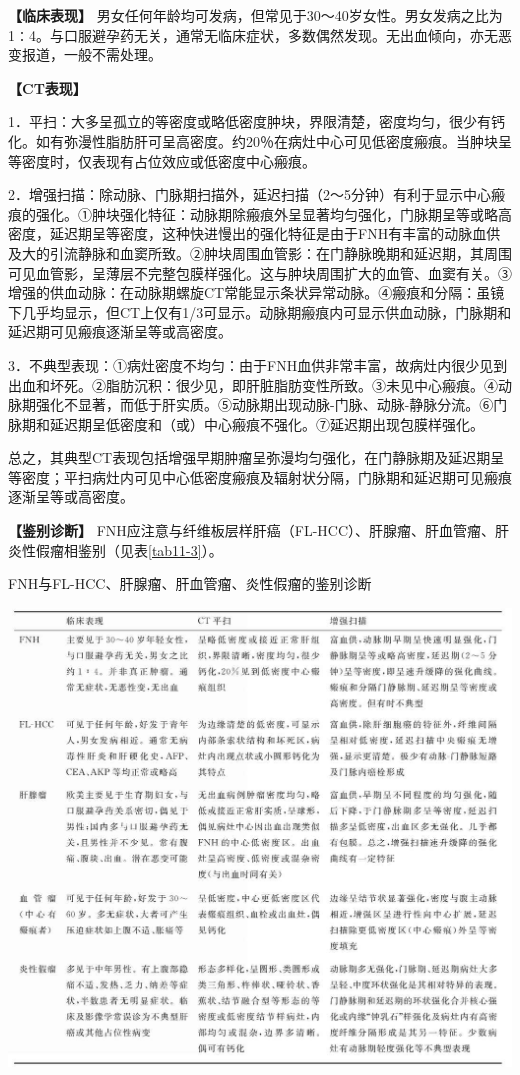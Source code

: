 \textbf{【临床表现】}
男女任何年龄均可发病，但常见于30～40岁女性。男女发病之比为1∶4。与口服避孕药无关，通常无临床症状，多数偶然发现。无出血倾向，亦无恶变报道，一般不需处理。

\textbf{【CT表现】}

1．平扫：大多呈孤立的等密度或略低密度肿块，界限清楚，密度均匀，很少有钙化。如有弥漫性脂肪肝可呈高密度。约20％在病灶中心可见低密度瘢痕。当肿块呈等密度时，仅表现有占位效应或低密度中心瘢痕。

2．增强扫描：除动脉、门脉期扫描外，延迟扫描（2～5分钟）有利于显示中心瘢痕的强化。①肿块强化特征：动脉期除瘢痕外呈显著均匀强化，门脉期呈等或略高密度，延迟期呈等密度，这种快进慢出的强化特征是由于FNH有丰富的动脉血供及大的引流静脉和血窦所致。②肿块周围血管影：在门静脉晚期和延迟期，其周围可见血管影，呈薄层不完整包膜样强化。这与肿块周围扩大的血管、血窦有关。③增强的供血动脉：在动脉期螺旋CT常能显示条状异常动脉。④瘢痕和分隔：虽镜下几乎均显示，但CT上仅有1/3可显示。动脉期瘢痕内可显示供血动脉，门脉期和延迟期可见瘢痕逐渐呈等或高密度。

3．不典型表现：①病灶密度不均匀：由于FNH血供非常丰富，故病灶内很少见到出血和坏死。②脂肪沉积：很少见，即肝脏脂肪变性所致。③未见中心瘢痕。④动脉期强化不显著，而低于肝实质。⑤动脉期出现动脉-门脉、动脉-静脉分流。⑥门脉期和延迟期呈低密度和（或）中心瘢痕不强化。⑦延迟期出现包膜样强化。

总之，其典型CT表现包括增强早期肿瘤呈弥漫均匀强化，在门静脉期及延迟期呈等密度；平扫病灶内可见中心低密度瘢痕及辐射状分隔，门脉期和延迟期可见瘢痕逐渐呈等或高密度。

\textbf{【鉴别诊断】}
FNH应注意与纤维板层样肝癌（FL-HCC）、肝腺瘤、肝血管瘤、肝炎性假瘤相鉴别（见表\ref{tab11-3}）。

\begin{table}[htbp]
\centering
\caption{FNH与FL-HCC、肝腺瘤、肝血管瘤、炎性假瘤的鉴别诊断}
\label{tab11-3}
\includegraphics[width=\textwidth,height=\textheight,keepaspectratio]{./images/Image00280.jpg}
\end{table}

